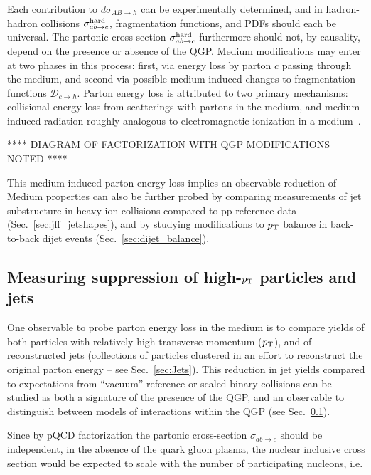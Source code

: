 \noindent Each contribution to $d \sigma_{AB\rightarrow h}$ can be experimentally determined, and in hadron-hadron collisions $\sigma_{ab\rightarrow c}^{\rm hard}$, fragmentation functions, and PDFs should each be universal.  The partonic cross section $\sigma_{ab\rightarrow c}^{\rm hard}$ furthermore should not, by causality, depend on the presence or absence of the QGP.  Medium modifications may enter at two phases in this process:  first, via energy loss by parton $c$ passing through the medium, and second via possible medium-induced changes to fragmentation functions $\mathscr{D}_{c\rightarrow h}$.  Parton energy loss is attributed to two primary mechanisms:  collisional energy loss from scatterings with partons in the medium, and medium induced radiation roughly analogous to electromagnetic ionization in a medium~\cite{Bjorken:1982tu, d'Enterria:2009am}.  

**** DIAGRAM OF FACTORIZATION WITH QGP MODIFICATIONS NOTED ****

This medium-induced parton energy loss implies an observable reduction of Medium properties can also be further probed by comparing measurements of jet substructure in heavy ion collisions compared to pp reference data (Sec.~\ref{sec:jff_jetshapes}), and by studying modifications to $p_{\rm T}$ balance in back-to-back dijet events (Sec.~\ref{sec:dijet_balance}).


\subsection{Measuring suppression of high-$p_{\rm T}$ particles and jets}
\label{sec:raa}

One observable to probe parton energy loss in the medium is to compare yields of both particles with relatively high transverse momentum ($p_{\rm T}$), and of reconstructed jets (collections of particles clustered in an effort to reconstruct the original parton energy -- see Sec.~\ref{sec:Jets}).  This reduction in jet yields compared to expectations from ``vacuum'' reference or scaled binary collisions can be studied as both a signature of the presence of the QGP, and an observable to distinguish between models of interactions within the QGP (see Sec.~\ref{sec:raa}).  

Since by pQCD factorization the partonic cross-section $\sigma_{ab\rightarrow c}$ should be independent, in the absence of the quark gluon plasma, the nuclear inclusive cross section would be expected to scale with the number of participating nucleons, i.e.  


